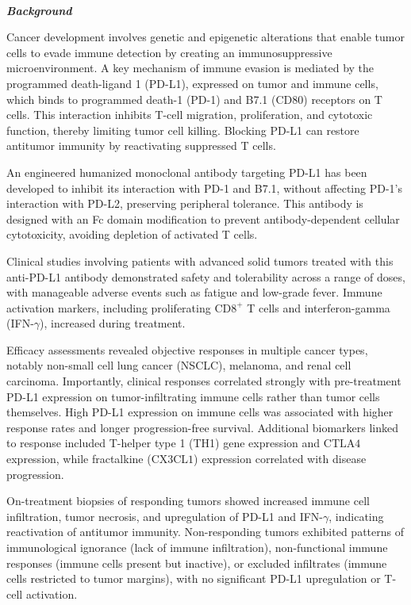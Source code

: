 \

\begin{tcolorbox}[
    breakable,
    title=Example of Wet Experiment in Life,
    colback=LighterGray,
    colframe=DeepPurple,
    colbacktitle=DeepPurple,
    coltitle=White,
]
\textbf{\emph{\textcolor{DeepPurple}{Background}}}

Cancer development involves genetic and epigenetic alterations that enable tumor cells to evade immune detection by creating an immunosuppressive microenvironment. A key mechanism of immune evasion is mediated by the programmed death-ligand 1 (PD-L1), expressed on tumor and immune cells, which binds to programmed death-1 (PD-1) and B7.1 (CD80) receptors on T cells. This interaction inhibits T-cell migration, proliferation, and cytotoxic function, thereby limiting tumor cell killing. Blocking PD-L1 can restore antitumor immunity by reactivating suppressed T cells.

An engineered humanized monoclonal antibody targeting PD-L1 has been developed to inhibit its interaction with PD-1 and B7.1, without affecting PD-1's interaction with PD-L2, preserving peripheral tolerance. This antibody is designed with an Fc domain modification to prevent antibody-dependent cellular cytotoxicity, avoiding depletion of activated T cells.

Clinical studies involving patients with advanced solid tumors treated with this anti-PD-L1 antibody demonstrated safety and tolerability across a range of doses, with manageable adverse events such as fatigue and low-grade fever. Immune activation markers, including proliferating $\mathrm{CD8}^+$ T cells and interferon-gamma (IFN-$\gamma$), increased during treatment.

Efficacy assessments revealed objective responses in multiple cancer types, notably non-small cell lung cancer (NSCLC), melanoma, and renal cell carcinoma. Importantly, clinical responses correlated strongly with pre-treatment PD-L1 expression on tumor-infiltrating immune cells rather than tumor cells themselves. High PD-L1 expression on immune cells was associated with higher response rates and longer progression-free survival. Additional biomarkers linked to response included T-helper type 1 (TH1) gene expression and $\mathrm{CTLA4}$ expression, while fractalkine ($\mathrm{CX3CL1}$) expression correlated with disease progression.

On-treatment biopsies of responding tumors showed increased immune cell infiltration, tumor necrosis, and upregulation of PD-L1 and IFN-$\gamma$, indicating reactivation of antitumor immunity. Non-responding tumors exhibited patterns of immunological ignorance (lack of immune infiltration), non-functional immune responses (immune cells present but inactive), or excluded infiltrates (immune cells restricted to tumor margins), with no significant PD-L1 upregulation or T-cell activation.


\end{tcolorbox}
